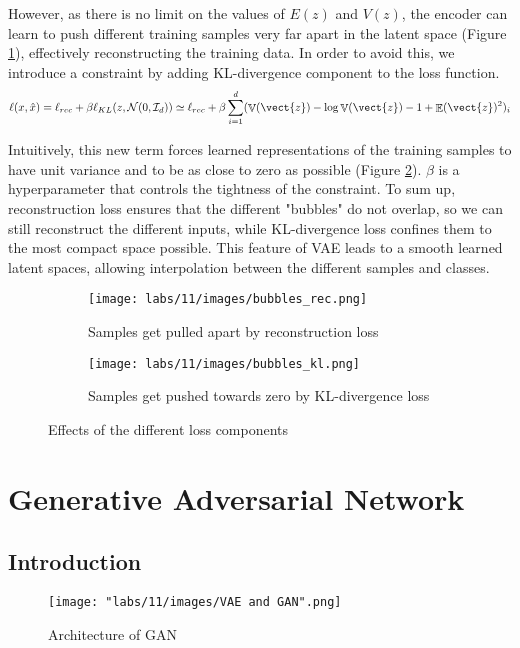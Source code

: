 However, as there is no limit on the values of $E(z)$ and $V(z)$, the encoder can learn to push different training samples very far apart in the latent space (Figure \ref{fig:bubbles_rec}), effectively reconstructing the training data. In order to avoid this, we introduce a constraint by adding KL-divergence component to the loss function. 
\begin{align*}
    \ell(x, \hat{x}) = \ell_{rec} + \beta \ell_{KL} (z, \mathcal{N}(0, \mathcal{I}_d)) \simeq \ell_{rec} + \beta\sum_{i=1}^d (\mathop{\mathbb{V}}(\vect{z}) - \log{\mathop{\mathbb{V}}(\vect{z})} - 1 + \mathop{\mathbb{E}}(\vect{z})^2)_i
\end{align*}

Intuitively, this new term forces learned representations of the training samples to have unit variance and to be as close to zero as possible (Figure \ref{fig:bubbles_kl}). $\beta$ is a hyperparameter that controls the tightness of the constraint. To sum up, reconstruction loss ensures that the different "bubbles" do not overlap, so we can still reconstruct the different inputs, while KL-divergence loss confines them to the most compact space possible. This feature of VAE leads to a smooth learned latent spaces, allowing interpolation between the different samples and classes.

\begin{figure}[H]
    \centering
    \begin{subfigure}[b]{.45\linewidth}
    \texttt{[image: labs/11/images/bubbles\_rec.png]}
    \caption{Samples get pulled apart by reconstruction loss}\label{fig:bubbles_rec}
    \end{subfigure}
    \begin{subfigure}[b]{.45\linewidth}
    \texttt{[image: labs/11/images/bubbles\_kl.png]}
    \caption{Samples get pushed towards zero by KL-divergence loss}\label{fig:bubbles_kl}
    \end{subfigure}
    \caption{Effects of the different loss components}
    \label{fig:bubbles}
\end{figure}

\section{Generative Adversarial Network}
\subsection{Introduction}
\begin{figure}
    \centering
    \texttt{[image: "labs/11/images/VAE and GAN".png]}
    \caption{Architecture of GAN}
    \label{fig:GAN architecture}
\end{figure}

